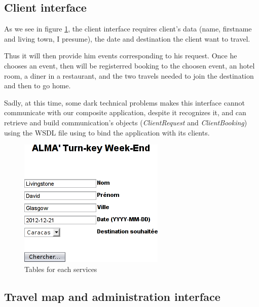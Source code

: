 \documentclass[a4paper]{article}
\begin{document}
		\subsection{Client interface}
		
		As we see in figure \ref{fig:clientiface}, the client interface requires client's data (name, firstname and living town, I presume), the date and destination the client want to travel.
		
		Thus it will then provide him events corresponding to his request. Once he chooses an event, then will be registerred booking to the choosen event, an hotel room, a diner in a restaurant, and the two travels needed to join the destination and then to go home.
		
		Sadly, at this time, some dark technical problems makes this interface cannot communicate with our composite application, despite it recognizes it, and can retrieve and build communication's objects (\emph{ClientRequest} and \emph{ClientBooking}) using the WSDL file using to bind the application with its clients.
		
		\begin{figure}[htp]
			\centering
			\includegraphics[width=\textwidth/2]{clientiface.png}
			\caption{Tables for each services}
			\label{fig:clientiface}
		\end{figure}
		
		\subsection{Travel map and administration interface}
		
\end{document}
